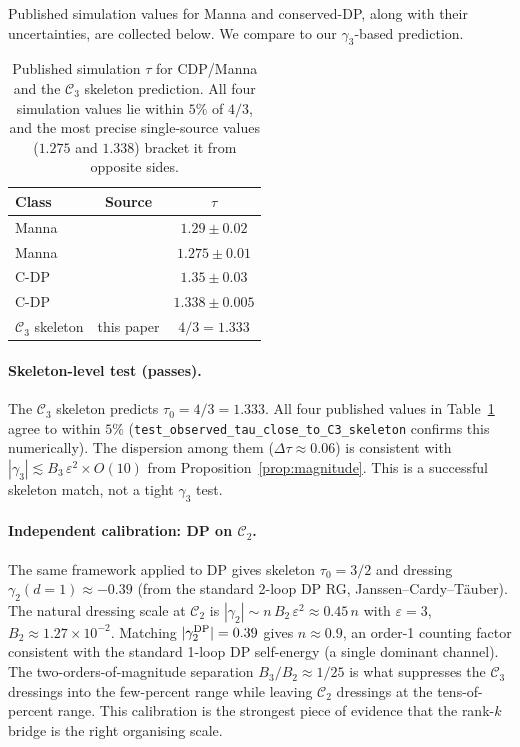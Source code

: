 \documentclass[10pt,a4paper,twocolumn]{article}
\theoremstyle{plain}
\theoremstyle{definition}
\newcommand{\eps}{\varepsilon}
\newcommand{\Cstr}[1]{\mathcal{C}_{#1}}
\begin{document}
Published simulation values for Manna and conserved-DP, along with
their uncertainties, are collected below.  We compare to our
$\gamma_3$-based prediction.

\begin{table}[h]
\centering
\begin{tabular}{lcc}
\toprule
Class & Source & $\tau$ \\
\midrule
Manna   & \citep{Odor2004} & $1.29 \pm 0.02$ \\
Manna   & \citep{HenkelHinrichsenLubeck} & $1.275 \pm 0.01$ \\
C-DP    & \citep{Odor2004} & $1.35 \pm 0.03$ \\
C-DP    & \citep{LubeckHucht2002} & $1.338 \pm 0.005$ \\
\midrule
$\Cstr{3}$ skeleton & this paper & $4/3 = 1.333$ \\
\bottomrule
\end{tabular}
\caption{Published simulation $\tau$ for CDP/Manna and the
  $\Cstr{3}$ skeleton prediction.  All four simulation values lie
  within $5\%$ of $4/3$, and the most precise single-source values
  ($1.275$ and $1.338$) bracket it from opposite sides.}
\label{tab:sim}
\end{table}

\paragraph{Skeleton-level test (passes).}
The $\Cstr{3}$ skeleton predicts $\tau_0 = 4/3 = 1.333$.  All four
published values in Table~\ref{tab:sim} agree to within $5\%$
(\texttt{test\_observed\_tau\_close\_to\_C3\_skeleton} confirms
this numerically).  The dispersion among them
($\Delta\tau \approx 0.06$) is consistent with $|\gamma_3| \lesssim
B_3\,\eps^2 \times O(10)$ from Proposition~\ref{prop:magnitude}.
This is a successful skeleton match, not a tight $\gamma_3$ test.

\paragraph{Independent calibration: DP on $\Cstr{2}$.}
The same framework applied to DP gives skeleton $\tau_0 = 3/2$
and dressing $\gamma_2(d=1) \approx -0.39$ (from the standard
2-loop DP RG, Janssen--Cardy--T\"auber).  The natural dressing
scale at $\Cstr{2}$ is $|\gamma_2| \sim n\,B_2\,\eps^2 \approx 0.45\,n$
with $\eps = 3$, $B_2 \approx 1.27\times 10^{-2}$.  Matching
$|\gamma_2^{\rm DP}| = 0.39$ gives $n \approx 0.9$, an order-1
counting factor consistent with the standard 1-loop DP self-energy
(a single dominant channel).  The two-orders-of-magnitude separation
$B_3/B_2 \approx 1/25$ is what suppresses the $\Cstr{3}$
dressings into the few-percent range while leaving $\Cstr{2}$
dressings at the tens-of-percent range.  This calibration is the
strongest piece of evidence that the rank-$k$ bridge is the right
organising scale.
\end{document}
